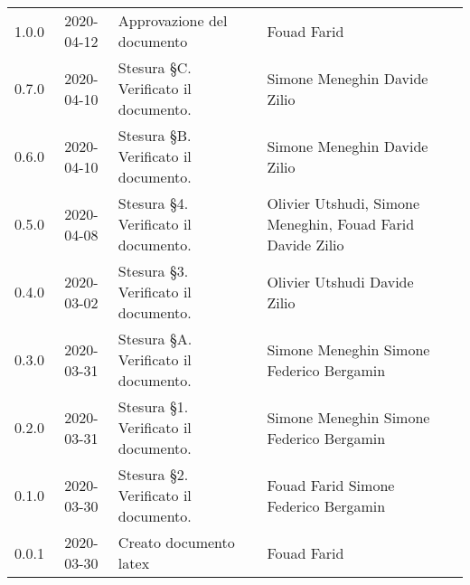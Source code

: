 {\begin{longtable}{ c c  C{4cm}  C{3.5cm}  C{3.5cm} }
		1.0.0 & 2020-04-12 & Approvazione del documento & Fouad Farid &\RdP{} \\
		0.7.0 & 2020-04-10 & Stesura \S C. Verificato il documento. & Simone Meneghin \newline Davide Zilio &\prog{}\newline \ver{} \\
		0.6.0 & 2020-04-10 & Stesura \S B. Verificato il documento. & Simone Meneghin \newline Davide Zilio&\prog{} \newline \ver{}\\
		0.5.0 & 2020-04-08 & Stesura \S 4. Verificato il documento. & Olivier Utshudi, Simone Meneghin, Fouad Farid \newline Davide Zilio &\prog{} \newline \prog{} \newline \prog{} \newline \ver{} \\
		0.4.0 & 2020-03-02 & Stesura \S 3. Verificato il documento. & Olivier Utshudi \newline Davide Zilio &\prog{} \newline \ver{} \\
		0.3.0 & 2020-03-31 & Stesura \S A. Verificato il documento. & Simone Meneghin \newline Simone Federico Bergamin&\prog{} \newline \ver{} \\
		0.2.0 & 2020-03-31 & Stesura \S 1. Verificato il documento. & Simone Meneghin \newline Simone Federico Bergamin&\prog{} \newline \ver{} \\
		0.1.0 & 2020-03-30 & Stesura \S 2. Verificato il documento. & Fouad Farid \newline Simone Federico Bergamin &\prog{} \newline \ver{} \\
		0.0.1 & 2020-03-30 & Creato documento latex & Fouad Farid &\prog{}\\		
		
	\end{longtable}

}